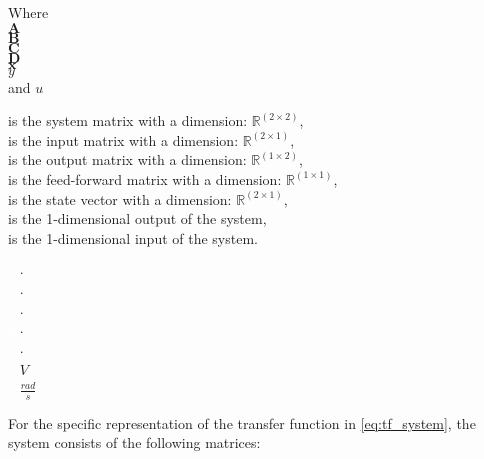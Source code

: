 \begin{minipage}[t]{0.20\textwidth}
Where\\
\hspace*{8mm} $\mathbf{A}$ \\
\hspace*{8mm} $\mathbf{B}$ \\
\hspace*{8mm} $\mathbf{C}$ \\
\hspace*{8mm} $\mathbf{D}$ \\
\hspace*{8mm} $\mathbf{x}$  \\
\hspace*{8mm} $y$  \\
\hspace*{8mm} and $u$  
\end{minipage}
\begin{minipage}[t]{0.68\textwidth}
\vspace*{2mm}
is the system matrix with a dimension: $\mathbb{R}^{(2 \times 2)}$,\\
is the input matrix with a dimension: $\mathbb{R}^{(2 \times 1)}$, \\
is the output matrix with a dimension: $\mathbb{R}^{(1 \times 2)}$, \\
is the feed-forward matrix with a dimension: $\mathbb{R}^{(1 \times 1)}$, \\
is the state vector with a dimension: $\mathbb{R}^{(2 \times 1)}$, \\
is the 1-dimensional output of the system, \\
is the 1-dimensional input of the system. 

\end{minipage}
\begin{minipage}[t]{0.10\textwidth}
\vspace*{2mm}
\textcolor{White}{te}$\unit{\cdot}$\\
\textcolor{White}{te}$\unit{\cdot}$\\
\textcolor{White}{te}$\unit{\cdot}$\\
\textcolor{White}{te}$\unit{\cdot}$\\
\textcolor{White}{te}$\unit{\cdot}$\\
\textcolor{White}{te}$\unit{V}$\\
\textcolor{White}{te}$\unit{\frac{rad}{s}}$
\end{minipage}

For the specific representation of the transfer function in \eqref{eq:tf_system}, the system consists of the following matrices: 

